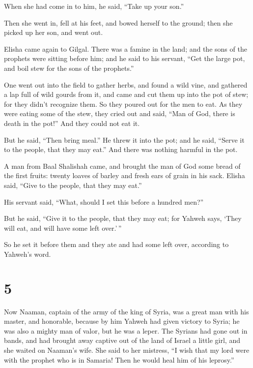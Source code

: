 When she had come in to him, he said, ``Take up your son.''

 Then she went in, fell at his feet, and bowed herself to
the ground; then she picked up her son, and went out.

 Elisha came again to Gilgal. There was a famine in the
land; and the sons of the prophets were sitting before him; and he said
to his servant, ``Get the large pot, and boil stew for the sons of the
prophets.''

 One went out into the field to gather herbs, and found a
wild vine, and gathered a lap full of wild gourds from it, and came and
cut them up into the pot of stew; for they didn't recognize them.
 So they poured out for the men to eat. As they were eating
some of the stew, they cried out and said, ``Man of God, there is death
in the pot!'' And they could not eat it.

 But he said, ``Then bring meal.'' He threw it into the
pot; and he said, ``Serve it to the people, that they may eat.'' And
there was nothing harmful in the pot.

 A man from Baal Shalishah came, and brought the man of God
some bread of the first fruits: twenty loaves of barley and fresh ears
of grain in his sack. Elisha said, ``Give to the people, that they may
eat.''

 His servant said, ``What, should I set this before a
hundred men?''

But he said, ``Give it to the people, that they may eat; for Yahweh
says, `They will eat, and will have some left over.'\,''

 So he set it before them and they ate and had some left
over, according to Yahweh's word.

\hypertarget{section-4}{%
\section{5}\label{section-4}}

 Now Naaman, captain of the army of the king of Syria, was a
great man with his master, and honorable, because by him Yahweh had
given victory to Syria; he was also a mighty man of valor, but he was a
leper.  The Syrians had gone out in bands, and had brought
away captive out of the land of Israel a little girl, and she waited on
Naaman's wife.  She said to her mistress, ``I wish that my
lord were with the prophet who is in Samaria! Then he would heal him of
his leprosy.''

